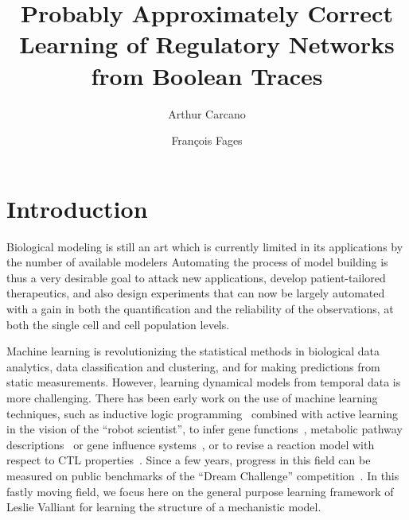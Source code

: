 \documentclass{llncs}
\begin{document}
\title{Probably Approximately Correct Learning of Regulatory Networks from Boolean Traces}

\author{Arthur Carcano \and Fran\c{c}ois Fages}

\maketitle



\begin{abstract}

\end{abstract}

\section{Introduction}


Biological modeling is still an art which is currently limited in its applications by the number of available modelers
Automating the process of model building is thus a very desirable goal
to attack new applications, develop patient-tailored therapeutics,
and also design experiments that can now be largely automated
with a gain in both the quantification and the reliability of the observations, at both the single cell and cell population levels.

Machine learning is revolutionizing the statistical methods in biological data analytics,
data classification and clustering, and for making predictions from static measurements.
However, learning dynamical models from temporal data is more challenging.
There has been early work on the use of machine learning techniques, such as inductive
 logic programming~\cite{Muggleton95ngc} combined with active learning in the vision of the ``robot scientist'',
to infer gene functions~\cite{BMOKRK01etai},
metabolic pathway descriptions~\cite{AM02etai,AM02slps}
or gene influence systems~\cite{BCRG04jtb},
or to revise a reaction model with respect to CTL properties~\cite{CCFS06tcsb}.
Since a few years, progress in this field can be measured on public benchmarks
of the ``Dream Challenge'' competition~\cite{Meyer14bmc}.
In this fastly moving field, we focus here on the general purpose learning framework of Leslie Valliant for learning the structure of a mechanistic model.
\end{document}
